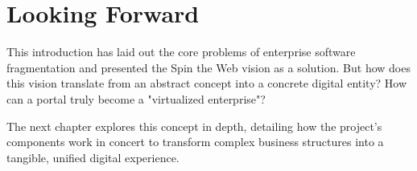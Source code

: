 \section{Looking Forward}
\label{sec:looking-forward}

This introduction has laid out the core problems of enterprise software fragmentation and presented the Spin the Web vision as a solution. But how does this vision translate from an abstract concept into a concrete digital entity? How can a portal truly become a "virtualized enterprise"?

The next chapter explores this concept in depth, detailing how the project's components work in concert to transform complex business structures into a tangible, unified digital experience.
